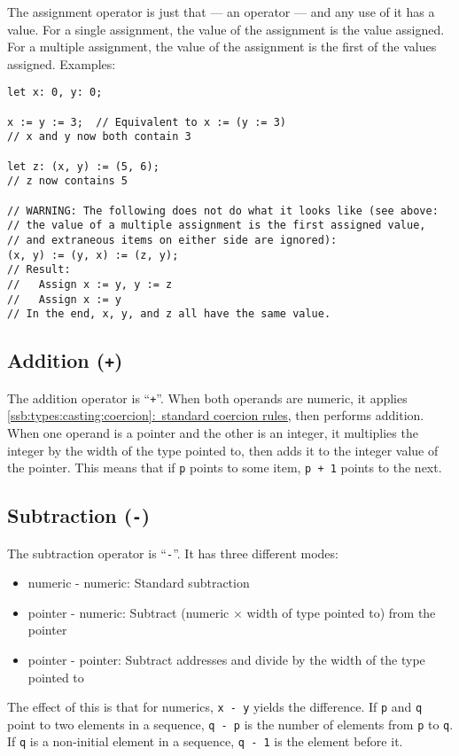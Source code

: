 \documentclass{article}
\newcommand{\textref}[2]{\hyperref[#1]{\underline{\ref*{#1}:~#2}}}
\begin{document}
The assignment operator is just that --- an operator --- and any use of it has
a value. For a single assignment, the value of the assignment is the value
assigned. For a multiple assignment, the value of the assignment is the first
of the values assigned. Examples:
\begin{verbatim}
let x: 0, y: 0;

x := y := 3;  // Equivalent to x := (y := 3)
// x and y now both contain 3

let z: (x, y) := (5, 6);
// z now contains 5

// WARNING: The following does not do what it looks like (see above:
// the value of a multiple assignment is the first assigned value,
// and extraneous items on either side are ignored):
(x, y) := (y, x) := (z, y);
// Result:
//   Assign x := y, y := z
//   Assign x := y
// In the end, x, y, and z all have the same value.
\end{verbatim}

\subsection{Addition (\texttt{+})}
\label{sub:operators:add}
The addition operator is ``\texttt{+}''. When both operands are numeric, it
applies \textref{ssb:types:casting:coercion}{standard coercion rules}, then
performs addition. When one operand is a pointer and the other is an integer,
it multiplies the integer by the width of the type pointed to, then adds it to
the integer value of the pointer. This means that if \texttt{p} points to some
item, \texttt{p~+~1} points to the next.

\subsection{Subtraction (\texttt{-})}
\label{sub:operators:sub}
The subtraction operator is ``\texttt{-}''. It has three different modes:
\begin{itemize}
  \item{numeric - numeric: Standard subtraction}
  \item{pointer - numeric: Subtract (numeric $\times$ width of type pointed to)
    from the pointer}
  \item{pointer - pointer: Subtract addresses and divide by the width of the
    type pointed to}
\end{itemize}
The effect of this is that for numerics, \texttt{x~-~y} yields the difference.
If \texttt{p} and \texttt{q} point to two elements in a sequence,
\texttt{q~-~p} is the number of elements from \texttt{p} to \texttt{q}.
If \texttt{q} is a non-initial element in a sequence, \texttt{q~-~1} is the
element before it.
\end{document}
